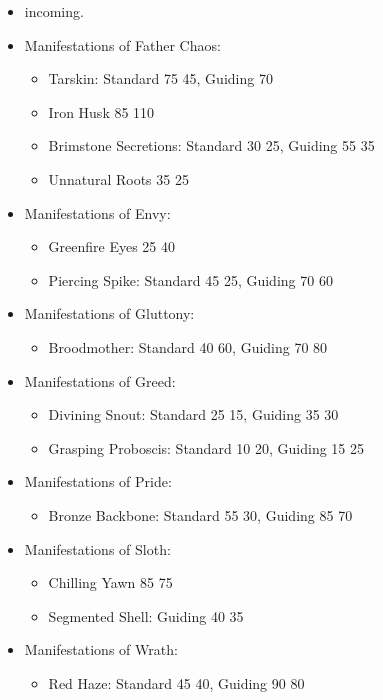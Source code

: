 \begin{itemize}
\item incoming.
\item Manifestations of Father Chaos:
\begin{itemize}
\item Tarskin: Standard 75 \costdown{} 45, Guiding 70
\item Iron Husk 85 \costup{} 110
\item Brimstone Secretions: Standard 30 \costdown{} 25, Guiding 55 \costdown{} 35
\item Unnatural Roots 35 \costdown{} 25
\end{itemize}
\item Manifestations of Envy:
\begin{itemize}
\item Greenfire Eyes 25 \costup{} 40
\item Piercing Spike: Standard 45 \costdown{} 25, Guiding 70 \costdown{} 60
\end{itemize}
\item Manifestations of Gluttony:
\begin{itemize}
\item Broodmother: Standard 40 \costup{} 60, Guiding 70 \costup{} 80
\end{itemize}
\item Manifestations of Greed:
\begin{itemize}
\item Divining Snout: Standard 25 \costdown{} 15, Guiding 35 \costdown{} 30
\item Grasping Proboscis: Standard 10 \costup{} 20, Guiding 15 \costup{} 25
\end{itemize}
\item Manifestations of Pride:
\begin{itemize}
\item Bronze Backbone: Standard 55 \costdown{} 30, Guiding 85 \costup{} 70
\end{itemize}
\item Manifestations of Sloth:
\begin{itemize}
\item Chilling Yawn 85 \costdown{} 75
\item Segmented Shell: Guiding 40 \costdown{} 35
\end{itemize}
\item Manifestations of Wrath:
\begin{itemize}
\item Red Haze: Standard 45 \costdown{} 40, Guiding 90 \costdown{} 80

\end{itemize}
\end{itemize}
